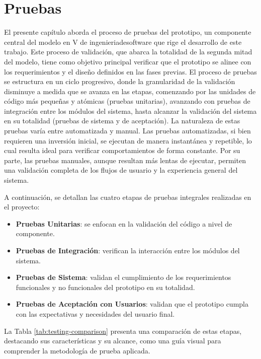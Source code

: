 \chapter[Pruebas]{Pruebas}
\label{cp:testing}

\parindent0pt

El presente capítulo aborda el proceso de pruebas del prototipo, un componente central del modelo en V de \gls{ingenieriadesoftware} que rige el desarrollo de este trabajo. Este proceso de validación, que abarca la totalidad de la segunda mitad del modelo, tiene como objetivo principal verificar que el prototipo se alinee con los requerimientos y el diseño definidos en las fases previas. El proceso de pruebas se estructura en un ciclo progresivo, donde la granularidad de la validación disminuye a medida que se avanza en las etapas, comenzando por las unidades de código más pequeñas y atómicas (pruebas unitarias), avanzando con pruebas de integración entre los módulos del sistema, hasta alcanzar la validación del sistema en su totalidad (pruebas de sistema y de aceptación). La naturaleza de estas pruebas varía entre automatizada y manual. Las pruebas automatizadas, si bien requieren una inversión inicial, se ejecutan de manera instantánea y repetible, lo cual resulta ideal para verificar comportamientos de forma constante. Por su parte, las pruebas manuales, aunque resultan más lentas de ejecutar, permiten una validación completa de los flujos de usuario y la experiencia general del sistema.

A continuación, se detallan las cuatro etapas de pruebas integrales realizadas en el proyecto:

\begin{itemize}
\item \textbf{Pruebas Unitarias}: se enfocan en la validación del código a nivel de componente.
\item \textbf{Pruebas de Integración}: verifican la interacción entre los módulos del sistema.
\item \textbf{Pruebas de Sistema}: validan el cumplimiento de los requerimientos funcionales y no funcionales del prototipo en su totalidad.
\item \textbf{Pruebas de Aceptación con Usuarios}: validan que el prototipo cumpla con las expectativas y necesidades del usuario final.
\end{itemize}

La Tabla \ref{tab:testing-comparison} presenta una comparación de estas etapas, destacando sus características y su alcance, como una guía visual para comprender la metodología de prueba aplicada.

